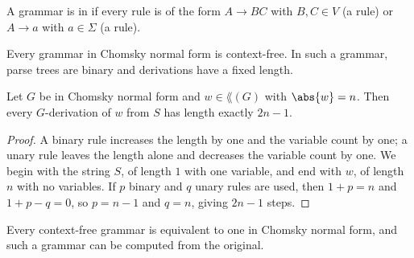 \begin{definition}
	A grammar is in  if every rule is of the form $A \to BC$ with $B, C \in V$ (a  rule) or $A \to a$ with $a \in \Sigma$ (a  rule).
\end{definition}

Every grammar in Chomsky normal form is context-free. In such a grammar, parse trees are binary and derivations have a fixed length.

\begin{lemma}\label{lem:cnflength}
	Let $G$ be in Chomsky normal form and $w \in \lang(G)$ with $\abs{w} = n$. Then every $G$-derivation of $w$ from $S$ has length exactly $2n - 1$.
\end{lemma}

\begin{proof}
	A binary rule increases the length by one and the variable count by one; a unary rule leaves the length alone and decreases the variable count by one. We begin with the string $S$, of length $1$ with one variable, and end with $w$, of length $n$ with no variables. If $p$ binary and $q$ unary rules are used, then $1 + p = n$ and $1 + p - q = 0$, so $p = n-1$ and $q = n$, giving $2n-1$ steps.
\end{proof}

\begin{theorem}[Chomsky]\label{thm:cnf}
	Every context-free grammar is equivalent to one in Chomsky normal form, and such a grammar can be computed from the original.
\end{theorem}

